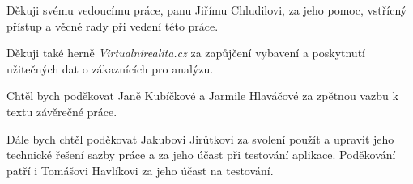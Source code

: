 Děkuji svému vedoucímu práce, panu Jiřímu Chludilovi, za jeho pomoc, vstřícný přístup a věcné rady při vedení této práce.

Děkuji také herně \emph{Virtualnirealita.cz} za zapůjčení vybavení a poskytnutí užitečných dat o zákaznících pro analýzu.

Chtěl bych poděkovat Janě Kubíčkové a Jarmile Hlaváčové za zpětnou vazbu k textu závěrečné práce.

Dále bych chtěl poděkovat Jakubovi Jirůtkovi za svolení použít a upravit jeho technické řešení sazby práce a za jeho účast při testování aplikace. Poděkování patří i Tomášovi Havlíkovi za jeho účast na testování.